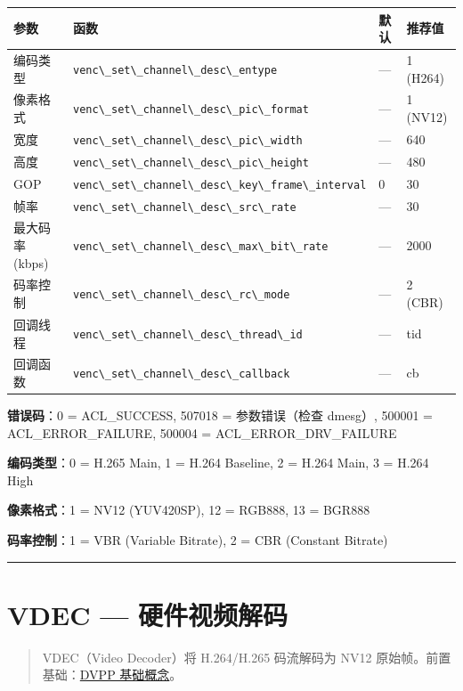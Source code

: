 \begin{longtable}[]{@{}llll@{}}
\toprule\noalign{}
参数 & 函数 & 默认 & 推荐值 \\
\midrule\noalign{}
\endhead
\bottomrule\noalign{}
\endlastfoot
编码类型 & \passthrough{\lstinline!venc\_set\_channel\_desc\_entype!} &
--- & 1 (H264) \\
像素格式 &
\passthrough{\lstinline!venc\_set\_channel\_desc\_pic\_format!} & --- &
1 (NV12) \\
宽度 & \passthrough{\lstinline!venc\_set\_channel\_desc\_pic\_width!} &
--- & 640 \\
高度 & \passthrough{\lstinline!venc\_set\_channel\_desc\_pic\_height!} &
--- & 480 \\
GOP &
\passthrough{\lstinline!venc\_set\_channel\_desc\_key\_frame\_interval!}
& 0 & 30 \\
帧率 & \passthrough{\lstinline!venc\_set\_channel\_desc\_src\_rate!} &
--- & 30 \\
最大码率 (kbps) &
\passthrough{\lstinline!venc\_set\_channel\_desc\_max\_bit\_rate!} & ---
& 2000 \\
码率控制 & \passthrough{\lstinline!venc\_set\_channel\_desc\_rc\_mode!}
& --- & 2 (CBR) \\
回调线程 &
\passthrough{\lstinline!venc\_set\_channel\_desc\_thread\_id!} & --- &
tid \\
回调函数 & \passthrough{\lstinline!venc\_set\_channel\_desc\_callback!}
& --- & cb \\
\end{longtable}

\textbf{错误码}：0 = ACL\_SUCCESS, 507018 = 参数错误（检查 dmesg）,
500001 = ACL\_ERROR\_FAILURE, 500004 = ACL\_ERROR\_DRV\_FAILURE

\textbf{编码类型}：0 = H.265 Main, 1 = H.264 Baseline, 2 = H.264 Main, 3
= H.264 High

\textbf{像素格式}：1 = NV12 (YUV420SP), 12 = RGB888, 13 = BGR888

\textbf{码率控制}：1 = VBR (Variable Bitrate), 2 = CBR (Constant
Bitrate)

\begin{center}\rule{0.5\linewidth}{0.5pt}\end{center}

\section{VDEC --- 硬件视频解码}\label{vdec}

\begin{quote}
VDEC（Video Decoder）将 H.264/H.265 码流解码为 NV12
原始帧。前置基础：\hyperref[dvpp-basics]{DVPP 基础概念}。
\end{quote}

